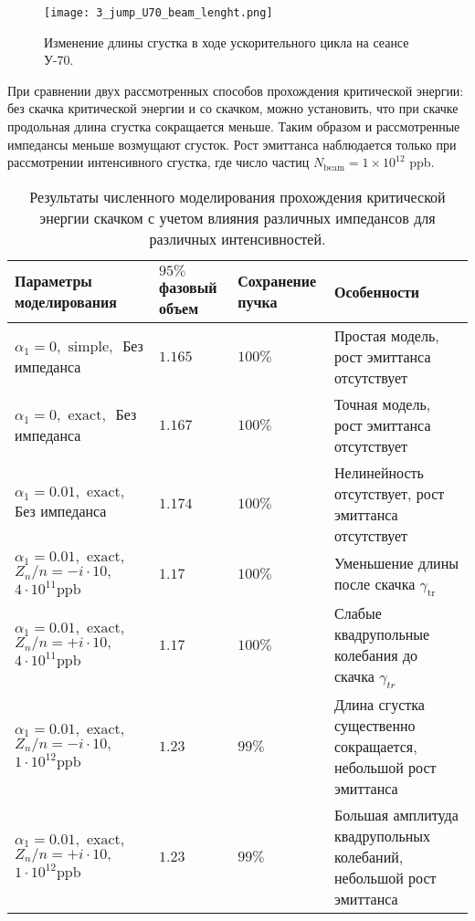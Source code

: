 \begin{figure}
   \centering
   \texttt{[image: 3\_jump\_U70\_beam\_lenght.png]}
   \caption{Изменение длины сгустка в ходе ускорительного цикла на сеансе У-70.}
   \label{fig:3_jump_U70_beam_lenght}
\end{figure}

\par При сравнении двух рассмотренных способов прохождения критической энергии: без скачка критической энергии и со скачком, можно установить, что при скачке продольная длина сгустка сокращается меньше. Таким образом и рассмотренные импедансы меньше возмущают сгусток. Рост эмиттанса наблюдается только при рассмотрении интенсивного сгустка, где число частиц $N_{\textrm{beam}}=1\times{10}^{12}$ ppb.

\begin{table}
\begin{center}
\begin{tabular}{| m{4cm} | M{2.5cm} | M{2.5cm} | m{6.6cm} |}
\hline 
Параметры моделирования & $95 \%$ фазовый объем & Сохранение пучка & Особенности \\
\hline
$ \alpha_1=0, \text { simple, } $ Без импеданса
 & $1.165$ & $100\%$ &
Простая модель, рост эмиттанса отсутствует \\
\hline
$ \alpha_1=0, \text { exact, } $ Без импеданса
 & $1.167$ & $100\%$ & 
Точная модель, рост эмиттанса отсутствует  \\
\hline
$ \alpha_1=0.01, \text { exact, }$ Без импеданса
 & $1.174$ & $100\%$ & Нелинейность отсутствует, рост эмиттанса отсутствует \\
\hline 
$ \alpha_1=0.01, \text { exact, } $
$ Z_n / n=-i \cdot 10, \quad $
$ 4 \cdot 10^{11} \mathrm{ppb} $
 & $1.17$ & $100\%$ & Уменьшение длины после скачка $\gamma_{\text {tr }}$ \\
\hline 
$ \alpha_1=0.01, \text { exact, } $
$ Z_n / n=+i \cdot 10, \quad $
$ 4 \cdot 10^{11} \mathrm{ppb} $
 & $1.17$ & $100\%$ & Слабые квадрупольные колебания до скачка $\gamma_{t r}$ \\
\hline
$ \alpha_1=0.01, \text { exact, } $
$ Z_n / n=-i \cdot 10, \quad$
$ 1 \cdot 10^{12} \mathrm{ppb} $
 & $1.23$ & $99\%$ & Длина сгустка существенно сокращается, небольшой рост эмиттанса \\
\hline
$ \alpha_1=0.01, \text { exact, } $
$ Z_n / n=+i \cdot 10, \quad$
$ 1 \cdot 10^{12} \mathrm{ppb} $
 & $1.23$ & $99\%$ & Большая амплитуда квадрупольных колебаний, небольшой рост эмиттанса \\
\hline
\end{tabular}
\end{center}
\caption{Результаты численного моделирования прохождения критической энергии скачком с учетом влияния различных импедансов для различных интенсивностей.}
\label{tab:u-70_model}
\end{table}

